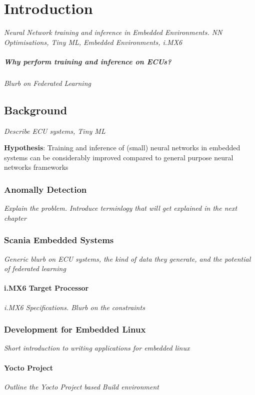 \part{Introduction}

\textit{Neural Network training and inference in Embedded Environments. NN Optimisations, Tiny ML, Embedded Environments, i.MX6}

\subsubsection{Why perform training and inference on ECUs?}
\textit{Blurb on Federated Learning}

\chapter{Background}
\textit{Describe ECU systems, Tiny ML}

\vspace{1em}
\noindent \textbf{Hypothesis}: Training and inference of (small) neural networks in embedded systems can be considerably improved compared to general purpose neural networks frameworks

\section{Anomally Detection}
\textit{Explain the problem. Introduce terminlogy that will get explained in the next chapter}

\section{Scania Embedded Systems}
\textit{Generic blurb on ECU systems, the kind of data they generate, and the potential of federated learning}

\subsection{i.MX6 Target Processor}
\textit{i.MX6 Specifications. Blurb on the constraints}

\section{Development for Embedded Linux}
\textit{Short introduction to writing applications for embedded linux}

\subsection{Yocto Project}
\textit{Outline the Yocto Project based Build environment}


